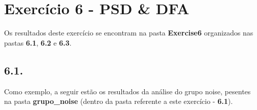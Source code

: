 
\section*{\large Exercício 6 - PSD \& DFA}
%

Os resultados deste exercício se encontram na pasta \textbf{Exercise6} organizados nas pastas \textbf{6.1}, \textbf{6.2} e \textbf{6.3}. 

\subsection*{6.1.}
%

Como exemplo, a seguir estão os resultados da análise do grupo noise, pesentes na pasta \textbf{grupo\_noise} (dentro da pasta referente a este exercício - \textbf{6.1}).

\begin{figure}[ht!]
	\vspace{-4mm}	%
	\begin{center}
	\end{center}
	\vspace{-2mm}	%
	\label{ex6_fig1}
\end{figure}

